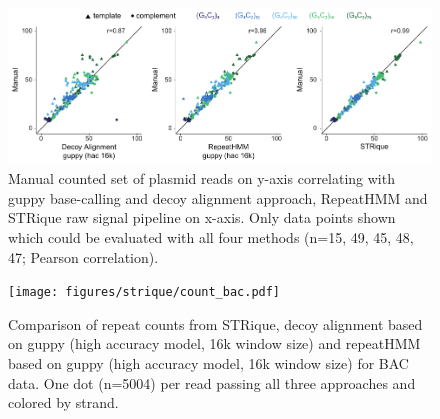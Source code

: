 \begin{figure}[h]
    \centering
    \includegraphics[width=1.0\textwidth]{figures/strique/count_signal_corr.pdf}
    \captionsetup{format=plain}
    \caption[Correlation and strand bias in STR analysis methods]{Manual counted set of plasmid reads on y-axis correlating with guppy base-calling and decoy alignment approach, RepeatHMM and STRique raw signal pipeline on x-axis. Only data points shown which could be evaluated with all four methods (n=15, 49, 45, 48, 47; Pearson correlation).}
    \label{fig:strique:count_signal_corr}
\end{figure}

\begin{figure}[h]
    \centering
    \texttt{[image: figures/strique/count\_bac.pdf]}
    \captionsetup{format=plain}
    \caption[Strand bias in sequence based repeat counts]{Comparison of repeat counts from STRique, decoy alignment based on guppy (high accuracy model, 16k window size) and repeatHMM based on guppy (high accuracy model, 16k window size) for BAC data. One dot (n=5004) per read passing all three approaches and colored by strand.}
    \label{fig:strique:count_bac}
\end{figure}

